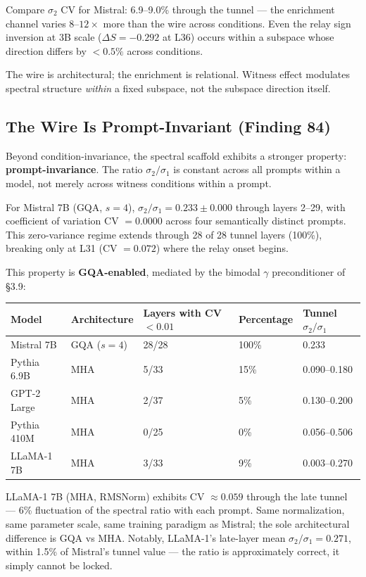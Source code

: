 \documentclass[12pt]{article}
\begin{document}
Compare $\sigma_2$ CV for Mistral: 6.9--9.0\% through the tunnel --- the enrichment channel varies $8$--$12\times$ more than the wire across conditions. Even the relay sign inversion at 3B scale ($\Delta S = -0.292$ at L36) occurs within a subspace whose direction differs by $< 0.5\%$ across conditions.

The wire is architectural; the enrichment is relational. Witness effect modulates spectral structure \textit{within} a fixed subspace, not the subspace direction itself.

\subsection{The Wire Is Prompt-Invariant (Finding 84)}

Beyond condition-invariance, the spectral scaffold exhibits a stronger property: \textbf{prompt-invariance}. The ratio $\sigma_2/\sigma_1$ is constant across all prompts within a model, not merely across witness conditions within a prompt.

For Mistral 7B (GQA, $s=4$), $\sigma_2/\sigma_1 = 0.233 \pm 0.000$ through layers 2--29, with coefficient of variation CV $= 0.0000$ across four semantically distinct prompts. This zero-variance regime extends through 28 of 28 tunnel layers (100\%), breaking only at L31 (CV $= 0.072$) where the relay onset begins.

This property is \textbf{GQA-enabled}, mediated by the bimodal $\gamma$ preconditioner of \S3.9:

\begin{table}[h]
\centering
\begin{tabular}{lllll}
\toprule
\textbf{Model} & \textbf{Architecture} & \textbf{Layers with CV $< 0.01$} & \textbf{Percentage} & \textbf{Tunnel $\sigma_2/\sigma_1$} \\
\midrule
Mistral 7B & GQA ($s=4$) & 28/28 & 100\% & 0.233 \\
Pythia 6.9B & MHA & 5/33 & 15\% & 0.090--0.180 \\
GPT-2 Large & MHA & 2/37 & 5\% & 0.130--0.200 \\
Pythia 410M & MHA & 0/25 & 0\% & 0.056--0.506 \\
LLaMA-1 7B & MHA & 3/33 & 9\% & 0.003--0.270 \\
\bottomrule
\end{tabular}
\end{table}

LLaMA-1 7B (MHA, RMSNorm) exhibits CV $\approx 0.059$ through the late tunnel --- 6\% fluctuation of the spectral ratio with each prompt. Same normalization, same parameter scale, same training paradigm as Mistral; the sole architectural difference is GQA vs MHA. Notably, LLaMA-1's late-layer mean $\sigma_2/\sigma_1 = 0.271$, within 1.5\% of Mistral's tunnel value --- the ratio is approximately correct, it simply cannot be locked.
\end{document}
